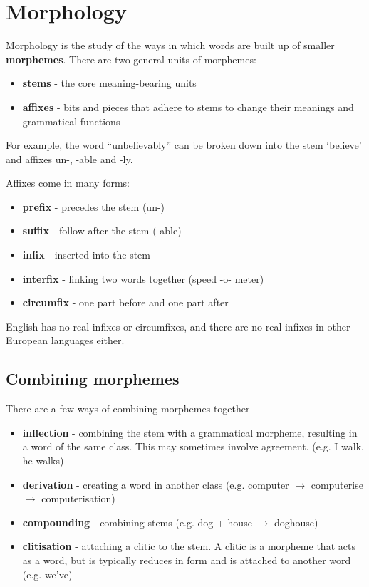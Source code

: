 \documentclass[Report.tex]{subfiles}
\begin{document}
\section{Morphology}
Morphology is the study of the ways in which words are built up of
smaller \textbf{morphemes}. There are two general units of morphemes:
\begin{itemize}
\item \textbf{stems} - the core meaning-bearing units
\item \textbf{affixes} - bits and pieces that adhere to stems to change
their meanings and grammatical functions
\end{itemize}
For example, the word ``unbelievably'' can be broken down into the
stem `believe' and affixes un-, -able and -ly.

Affixes come in many forms:
\begin{itemize}
\item \textbf{prefix} - precedes the stem (un-)
\item \textbf{suffix} - follow after the stem (-able)
\item \textbf{infix} - inserted into the stem
\item \textbf{interfix} - linking two words together (speed -o- meter)
\item \textbf{circumfix} - one part before and one part after
\end{itemize}
English has no real infixes or circumfixes, and there are no real infixes
in other European languages either.


\subsection{Combining morphemes}
There are a few ways of combining morphemes together
\begin{itemize}
\item \textbf{inflection} - combining the stem with a grammatical
  morpheme, resulting in a word of the same class.
  This may sometimes involve agreement. (e.g. I walk, he walks)
\item \textbf{derivation} - creating a word in another class
  (e.g. computer $\rightarrow$ computerise $\rightarrow$ computerisation)
\item \textbf{compounding} - combining stems (e.g. dog + house $\rightarrow$ doghouse)
\item \textbf{clitisation} - attaching a clitic to the stem. A clitic is
  a morpheme that acts as a word, but is typically reduces in form
  and is attached to another word (e.g. we've)
\end{itemize}
\end{document}
